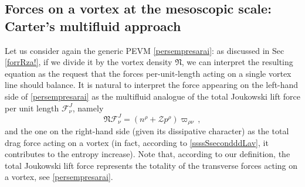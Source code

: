 \documentclass[preprints,article,accept,moreauthors,pdftex]{mdpi}
\begin{document}


\subsection{Forces on a vortex at the mesoscopic scale: Carter's multifluid approach}

Let us consider again the generic PEVM \eqref{persempresarai}: as discussed in Sec \ref{forrRza!}, if we divide it by the vortex density $\mathfrak{N}$, we can interpret the resulting equation as the request that the  forces per-unit-length acting on a single vortex line should balance. 
It is natural to interpret the force appearing on the left-hand side of \eqref{persempresarai} as the multifluid analogue of the total Joukowski lift force per unit length $\mathcal{F}^J_\nu$, namely 
\begin{equation}
\label{wdieokvmok}
\mathfrak{N} \mathcal{F}^J_\nu = (n^\rho +\mathcal{Z}p^\rho) \varpi_{\rho \nu} \, ,
\end{equation} 
 and the one on the right-hand side (given its dissipative character) as the total drag force acting on a vortex (in fact, according to \eqref{ssssSsecondddLav}, it contributes to the entropy increase). 
Note that, according to our definition, the total Joukowski lift force represents the totality of the transverse forces acting on a vortex, see \eqref{persempresarai}. 
 
\end{document}
